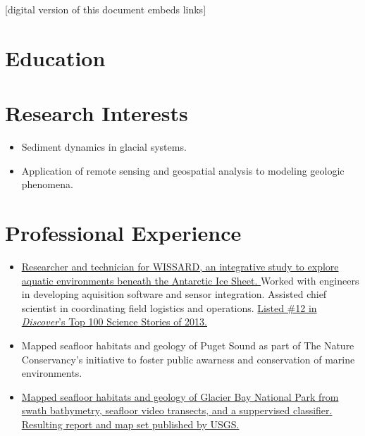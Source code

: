 \documentclass{cv_TOH}
\begin{document}
\vspace{-0.2cm}
\centerline{\footnotesize{[digital version of this document embeds links]}}

\section{Education}

\section{Research Interests}
\begin{itemize}
\item Sediment dynamics in glacial systems.
\item Application of remote sensing and geospatial analysis to modeling geologic phenomena.
\end{itemize}

\section{Professional Experience}

\begin{itemize}
\item \href{http://www.wissard.org}{Researcher and technician for WISSARD, an integrative study to explore aquatic environments beneath the Antarctic Ice Sheet. }Worked with engineers in developing aquisition software and sensor integration. Assisted chief scientist in coordinating field logistics and operations. \href{http://discovermagazine.com/2014/jan-feb/12-the-search-for-life-trapped-under-ice}{Listed \#12 in \textit{Discover}'s Top 100 Science Stories of 2013.}
\item Mapped seafloor habitats and geology of Puget Sound as part of The Nature Conservancy's initiative to foster public awarness and conservation of marine environments.
\item \href{http://pubs.usgs.gov/sim/3253/}{Mapped seafloor habitats and geology of Glacier Bay National Park from swath bathymetry, seafloor video transects, and a suppervised classifier. Resulting report and map set published by USGS.}
\end{itemize}
\end{document}
